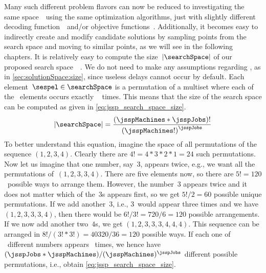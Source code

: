 Many such different problem flavors can now be reduced to investigating the same space~\searchSpace\ using the same optimization algorithms, just with slightly different decoding function~\decode\ and/or objective functions~\objf.
Additionally, it becomes  easy to indirectly create and modify candidate solutions by sampling points from the search space and moving to similar points, as we will see in the following chapters.
\endhsection%
%
%
\label{sec:size_of_jssp_search_space}%
%
It is relatively easy to compute the size~$\left|\searchSpace\right|$ of our proposed search space~\searchSpace~\cite{SIS1997NESFSJSPBGA}.
We do not need to make any assumptions regarding , as in \autoref{sec:solutionSpace:size}, since useless delays cannot occur by default.
Each element~$\sespel\in\searchSpace$ is a permutation of a multiset where each of the \jsspJobs~elements occurs exactly \jsspMachines~ times.
This means that the size of the search space can be computed as given in \autoref{eq:jssp_search_space_size}.%
%
\begin{align}%
\left|\searchSpace\right| = \frac{\left(\jsspMachines*\jsspJobs\right)!}{ \left(\jsspMachines!\right)^{\jsspJobs} }%
\label{eq:jssp_search_space_size}%
\end{align}%
%
To better understand this equation, imagine the space of all permutations of the sequence $(1, 2, 3, 4)$.
Clearly there are $4!=4*3*2*1=24$ such permutations.
Now let us imagine that one number, say~$3$, appears twice, e.g., we want all the permutations of~$(1, 2, 3, 3, 4)$.
There are five elements now, so there are $5!=120$~possible ways to arrange them.
However, the number~$3$ appears twice and it does not matter which of the~$3$s appears first, so we get $5!/2=60$ possible unique permutations.
If we add another~$3$, i.e., $3$~would appear three times and we have~$(1, 2, 3, 3, 3, 4)$, then there would be $6!/3!=720/6=120$ possible arrangements.
If we now add another two~$4$s, we get $(1, 2, 3, 3, 3, 4, 4, 4)$.
This sequence can be arranged in $8!/(3!*3!)=40320/36=120$ possible ways.
If each one of \jsspJobs~different numbers appears \jsspMachines~times, we hence have $(\jsspJobs*\jsspMachines)/(\jsspMachines)^{\jsspJobs}$ different possible permutations, i.e., obtain \autoref{eq:jssp_search_space_size}.

